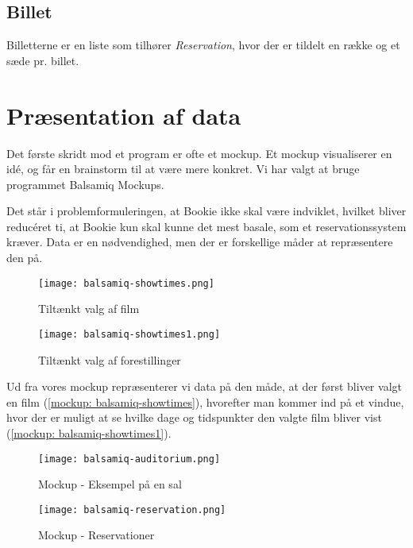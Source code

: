 \subsection{Billet}

Billetterne er en liste som tilhører \textit{Reservation}, hvor der er tildelt en række og et sæde pr. billet. 

\section{Præsentation af data}

Det første skridt mod et program er ofte et mockup. Et mockup visualiserer en idé, og får en brainstorm til at være mere konkret. Vi har valgt at bruge programmet Balsamiq Mockups.

Det står i problemformuleringen, at Bookie ikke skal være indviklet, hvilket bliver reducéret ti, at Bookie kun skal kunne det mest basale, som et reservationssystem kræver. Data er en nødvendighed, men der er forskellige måder at repræsentere den på.

\begin{figure}[h]
  \centering
  \begin{minipage}[b]{0.44\linewidth}
  \texttt{[image: balsamiq-showtimes.png]}
  \caption{Tiltænkt valg af film}
  \label{mockup:balsamiq-showtimes}
  \end{minipage}
  \hspace{0.5cm}
  \begin{minipage}[b]{0.46\linewidth}
  \texttt{[image: balsamiq-showtimes1.png]}
  \caption{Tiltænkt valg af forestillinger}
  \label{mockup:balsamiq-showtimes1}
  \end{minipage}
\end{figure}

Ud fra vores mockup repræsenterer vi data på den måde, at der først bliver valgt en film (\ref{mockup: balsamiq-showtimes}), hvorefter man kommer ind på et vindue, hvor der er muligt at se hvilke dage og tidspunkter den valgte film bliver vist (\ref{mockup: balsamiq-showtimes1}).

\begin{figure}[h]
  \centering
  \begin{minipage}[b]{0.42\linewidth}
  \texttt{[image: balsamiq-auditorium.png]}
  \caption{Mockup - Eksempel på en sal}
  \label{mockup: balsamiq-auditorium}
  \end{minipage}
  \hspace{0.5cm}
  \begin{minipage}[b]{0.48\linewidth}
  \texttt{[image: balsamiq-reservation.png]}
  \caption{Mockup - Reservationer}
  \label{mockup: balsamiq-reservation}
  \end{minipage}
\end{figure}


